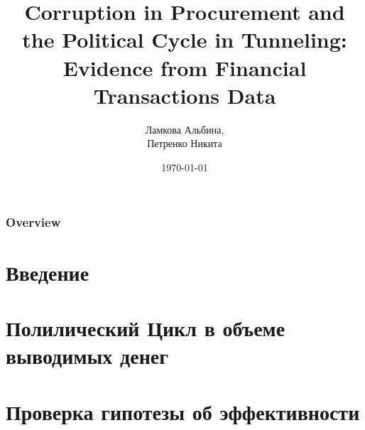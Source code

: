\documentclass{beamer}
\title[Corruption in Procurement]{Corruption in Procurement and the Political Cycle in Tunneling: Evidence from Financial Transactions Data}
\author{Ламкова Альбина,\\ Петренко Никита}
\date{\today}
\begin{document}
\begin{frame}
\titlepage
\end{frame}

\begin{frame}
\frametitle{Overview} %
\tableofcontents
\end{frame}



\section{Введение} 



\section{Полилический Цикл в объеме выводимых денег}



\section{Проверка гипотезы об эффективности}

\end{document}
